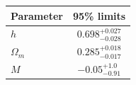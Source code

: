 \begin{tabular} { l  c}

 Parameter &  95\% limits\\
\hline
{\boldmath$h              $} & $0.698^{+0.027}_{-0.028}   $\\

{\boldmath$Ω_m            $} & $0.285^{+0.018}_{-0.017}   $\\

{\boldmath$M              $} & $-0.05^{+1.0}_{-0.91}      $\\
\hline
\end{tabular}